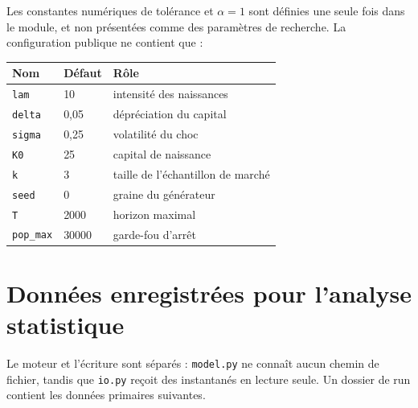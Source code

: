 \documentclass[11pt,a4paper]{article}
\newcommand{\code}[1]{\texttt{#1}}
\begin{document}
Les constantes numériques de tolérance et $\alpha=1$ sont définies une seule
fois dans le module, et non présentées comme des paramètres de recherche. La
configuration publique ne contient que :

\begin{center}
\begin{tabular}{@{}lll@{}}
\toprule
Nom & Défaut & Rôle \\
\midrule
\code{lam} & 10 & intensité des naissances \\
\code{delta} & 0,05 & dépréciation du capital \\
\code{sigma} & 0,25 & volatilité du choc \\
\code{K0} & 25 & capital de naissance \\
\code{k} & 3 & taille de l'échantillon de marché \\
\code{seed} & 0 & graine du générateur \\
\code{T} & 2000 & horizon maximal \\
\code{pop\_max} & 30000 & garde-fou d'arrêt \\
\bottomrule
\end{tabular}
\end{center}

\section{Données enregistrées pour l'analyse statistique}

Le moteur et l'écriture sont séparés : \code{model.py} ne connaît aucun
chemin de fichier, tandis que \code{io.py} reçoit des instantanés en lecture
seule. Un dossier de run contient les données primaires suivantes.
\end{document}
